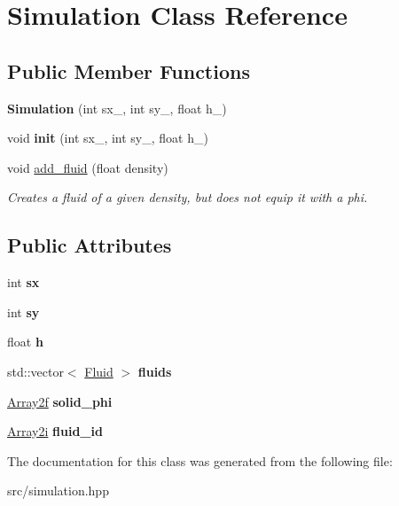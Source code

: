 \hypertarget{classSimulation}{}\section{Simulation Class Reference}
\label{classSimulation}
\subsection*{Public Member Functions}
\begin{DoxyCompactItemize}
\item 
\mbox{\label{classSimulation_a978e30ee06f1238fcef542bfb3ba0a0a}} 
{\bfseries Simulation} (int sx\+\_\+, int sy\+\_\+, float h\+\_\+)
\item 
\mbox{\label{classSimulation_aa1c5c6d790092c2d9829421bad83d741}} 
void {\bfseries init} (int sx\+\_\+, int sy\+\_\+, float h\+\_\+)
\item 
\mbox{\label{classSimulation_a1aa01e35508d7a15739eb16e15ab5e00}} 
void \mbox{\hyperlink{classSimulation_a1aa01e35508d7a15739eb16e15ab5e00}{add\+\_\+fluid}} (float density)
\begin{DoxyCompactList}\small\item\em Creates a fluid of a given density, but does not equip it with a phi. \end{DoxyCompactList}\end{DoxyCompactItemize}
\subsection*{Public Attributes}
\begin{DoxyCompactItemize}
\item 
\mbox{\label{classSimulation_a9a490119dc943a80ac7c3a2a3f56a638}} 
int {\bfseries sx}
\item 
\mbox{\label{classSimulation_af36a90f50c976712a091d33c4e3f5214}} 
int {\bfseries sy}
\item 
\mbox{\label{classSimulation_a9321bee67ee0cf2701fe9ae3b416ad95}} 
float {\bfseries h}
\item 
\mbox{\label{classSimulation_ab90ce229b4480792cf59177d1d171cd9}} 
std\+::vector$<$ \mbox{\hyperlink{classFluid}{Fluid}} $>$ {\bfseries fluids}
\item 
\mbox{\label{classSimulation_ab48f0b6a7b93dc830e628bb3cb48a3d6}} 
\mbox{\hyperlink{structArray2}{Array2f}} {\bfseries solid\+\_\+phi}
\item 
\mbox{\label{classSimulation_a8234c086edf5bd9835ea9094873d664d}} 
\mbox{\hyperlink{structArray2}{Array2i}} {\bfseries fluid\+\_\+id}
\end{DoxyCompactItemize}


The documentation for this class was generated from the following file\+:\begin{DoxyCompactItemize}
\item 
src/simulation.\+hpp\end{DoxyCompactItemize}
